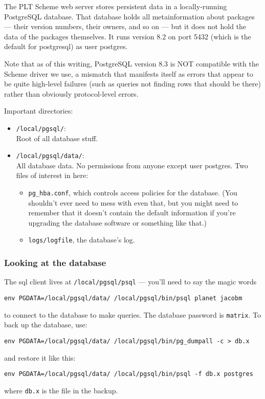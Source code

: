 \documentclass{article}
\begin{document}
The PLT Scheme web server stores persistent data in a locally-running
PostgreSQL database. That database holds all metainformation about
packages --- their version numbers, their owners, and so on --- but it
does not hold the data of the packages themselves. It runs version 8.2
on port 5432 (which is the default for postgresql) as user
postgres. 

Note that as of this writing, PostgreSQL version 8.3 is NOT compatible
with the Scheme driver we use, a mismatch that manifests itself as
errors that appear to be quite high-level failures (such as queries
not finding rows that should be there) rather than obviously
protocol-level errors.

Important directories: 
\begin{itemize}
\item \texttt{/local/pgsql/}: \\
Root of all database stuff.

\item \texttt{/local/pgsql/data/}: \\
All database data. No permissions from anyone
except user postgres. Two files of interest in here:
\begin{itemize}
  \item \texttt{pg\_hba.conf}, which controls access policies for
  the database. (You shouldn't ever need to mess with even that, but
  you might need to remember that it doesn't contain the default
  information if you're upgrading the database software or something
  like that.)
  \item \texttt{logs/logfile}, the database's log. 
\end{itemize}
\end{itemize}

\subsubsection{Looking at the database}

The sql client lives at \texttt{/local/pgsql/psql} --- you'll need to
say the magic words 
\begin{center}
\tt env PGDATA=/local/pgsql/data/ /local/pgsql/bin/psql planet jacobm
\end{center}
to connect to the database to make queries. The database password is \texttt{matrix}.
To back up the database, use:
\begin{center}
\verb|env PGDATA=/local/pgsql/data/ /local/pgsql/bin/pg_dumpall -c > db.x|
\end{center}
and restore it like this:
\begin{center}
\verb|env PGDATA=/local/pgsql/data/ /local/pgsql/bin/psql -f db.x postgres|
\end{center}
where \texttt{db.x} is the file in the backup.
\end{document}
